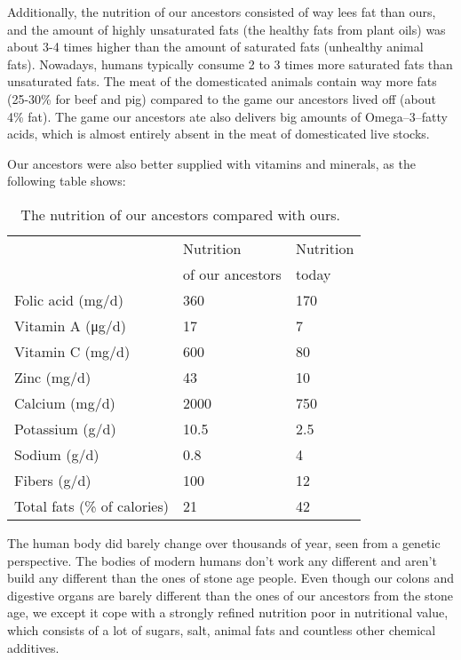 \documentclass[../main.tex]{subfiles}
\begin{document}
Additionally, the nutrition of our ancestors consisted of way lees fat than ours, and the amount of
highly unsaturated fats (the healthy fats from plant oils) was about 3-4 times higher
than the amount of saturated fats
(unhealthy animal fats).
Nowadays, humans typically consume 2 to 3 times more saturated fats than unsaturated fats.
The meat of the domesticated animals contain way more fats (25-30\% for beef and pig)
compared to the game our ancestors lived off (about 4\% fat).
The game our ancestors ate also delivers big amounts of Omega--3--fatty acids,
which is almost entirely absent in the meat of domesticated live stocks.

Our ancestors  were also better supplied with vitamins and minerals, as the following table shows:

\begin{table}[htb]
  \centering
  \begin{tabular}{l|l|l}
    & Nutrition & Nutrition \\
    & of our ancestors & today \\
    \hline
    Folic acid (\unit{\milli\gram/\day}) & 360 & 170 \\
    Vitamin A  (\unit{\micro\gram/\day}) & 17 & 7 \\
    Vitamin C (\unit{\milli\gram/\day}) & 600 & 80\\
    Zinc (\unit{\milli\gram/\day}) & 43 & 10 \\
    Calcium (\unit{\milli\gram/\day}) & 2000 & 750 \\
    Potassium (\unit{\gram/\day}) & 10.5 & 2.5 \\
    Sodium (\unit{\gram/\day}) & 0.8 & 4 \\
    Fibers (\unit{\gram/\day}) & 100 & 12 \\
    Total fats (\% of calories) & 21 & 42 \\
    \hline
  \end{tabular}
  \caption[Nutrition of our ancestors.]{The nutrition of our ancestors compared with ours.~\cite{EatonAl}}
\end{table}

The human body did barely change over thousands of year, seen from a genetic perspective.
The bodies of modern humans don't work any different and aren't build any different than the ones of stone age people.
Even though our colons and digestive organs are barely different than the ones of our ancestors from the stone age,
we except it cope with a strongly refined nutrition poor in nutritional value, which consists of a lot of sugars, salt,
animal fats and countless other chemical additives.
\end{document}
